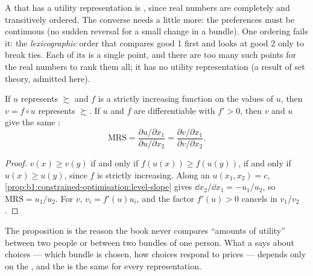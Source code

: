 A  that has a utility representation is , since
real numbers are completely and transitively ordered. The converse needs a
little more: the preferences must be continuous (no sudden reversal for a
small change in a bundle). One  ordering fails it: the
\emph{lexicographic} order that compares good 1 first and looks at good 2
only to break ties. Each of its  is a single point, and
there are too many such points for the real numbers to rank them all; it
has no utility representation (a result of set theory, admitted here).

\begin{proposition}\label{prop:b1:preferences-and-utility:ordinal}
If $u$ represents $\succsim$ and $f$ is a strictly increasing function on the
values of $u$, then $v = f \circ u$ represents $\succsim$. If $u$ and $f$ are
differentiable with $f' > 0$, then $v$ and $u$ give the same :
\[
\mathrm{MRS} = \frac{\partial u/\partial x_1}{\partial u/\partial x_2} = \frac{\partial v/\partial x_1}{\partial v/\partial x_2}.
\]
\end{proposition}

\begin{proof}
$v(x) \ge v(y)$ if and only if $f(u(x)) \ge f(u(y))$, if and only if
$u(x) \ge u(y)$, since $f$ is strictly increasing. Along an  $u(x_1, x_2) = c$, \cref{prop:b1:constrained-optimisation:level-slope}
gives $\dd x_2/\dd x_1 = -u_1/u_2$, so $\mathrm{MRS} = u_1/u_2$. For $v$,
$v_i = f'(u)u_i$, and the factor $f'(u) > 0$ cancels in $v_1/v_2$.
\end{proof}

The proposition is the reason the book never compares ``amounts of
utility'' between two people or between two bundles of one person. What a
 says about choices --- which bundle is chosen, how
choices respond to prices --- depends only on the , and the  is the
same for every representation.

